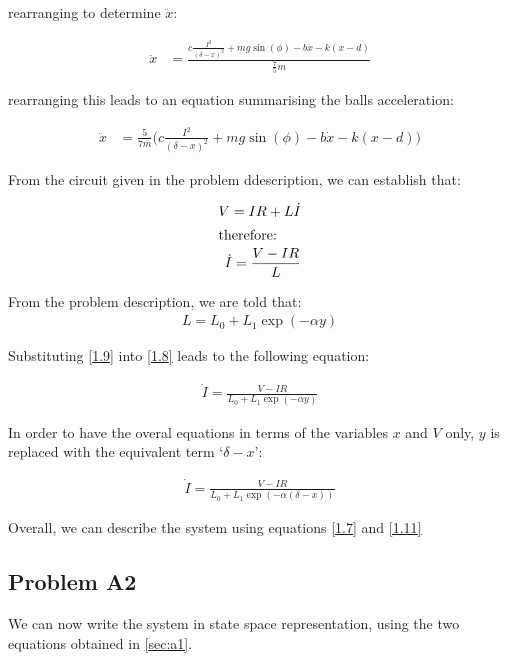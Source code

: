 \documentclass[a4paper,10pt,reqno]{amsart}
\numberwithin{equation}{section}
\begin{document}
rearranging to determine $\ddot{x}$:

\begin{align}
\ddot{x} &= \frac{c \frac{I^2}{(\delta - x)^2} + mg\sin(\phi) - b\dot{x} - k(x-d)}{\frac{7}{5}m} \label{1.6}
\end{align}

rearranging this leads to an equation summarising the balls acceleration:

\begin{align}
\ddot{x} &= \frac{5}{7m}\bigg(c \frac{I^2}{(\delta - x)^2} + mg\sin(\phi) - b\dot{x} - k(x-d)\bigg) \label{1.7}
\end{align}

\newline From the circuit given in the problem ddescription, we can establish that:

\begin{align}
V = IR + L\dot{I} \nonumber \\
\intertext{therefore:}
\dot{I} = \frac{V - IR}{L} \label{1.8}
\end{align}

\newline From the problem description, we are told that:
\begin{align}
L = L_0 + L_1\exp(-\alpha y) \label{1.9}
\end{align}

\newline Substituting \ref{1.9} into \ref{1.8} leads to the following equation:

\begin{align}
\dot{I} = \frac{V - IR}{L_0 + L_1\exp(-\alpha y)} \label{1.10}
\end{align}

\newline In order to have the overal equations in terms of the variables $x$ and $V$ only, $y$ is replaced with the equivalent term `$\delta - x$':

\begin{align}
\dot{I} = \frac{V - IR}{L_0 + L_1\exp(-\alpha (\delta - x))} \label{1.11}
\end{align}

\newline Overall, we can describe the system using equations \ref{1.7} and \ref{1.11}

\subsection{Problem A2}\label{sec:a2}
We can now write the system in state space representation, using the two equations obtained in \ref{sec:a1}.
\end{document}

